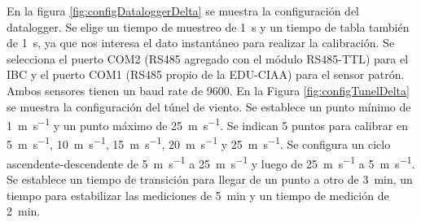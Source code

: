 En la figura \ref{fig:configDataloggerDelta} se muestra la configuración del datalogger. Se elige un tiempo de muestreo de \SI{1}{\second} y un tiempo de tabla también de \SI{1}{\second}, ya que nos interesa el dato instantáneo para realizar la calibración. Se selecciona el puerto COM2 (RS485 agregado con el módulo RS485-TTL) para el IBC y el puerto COM1 (RS485 propio de la EDU-CIAA) para el sensor patrón. Ambos sensores tienen un baud rate de \SI{9600}{}. En la Figura \ref{fig:configTunelDelta} se muestra la configuración del túnel de viento. Se establece un punto mínimo de \SI{1}{\meter\per\second} y un punto máximo de \SI{25}{\meter\per\second}. Se indican 5 puntos para calibrar en \SI{5}{\meter\per\second}, \SI{10}{\meter\per\second}, \SI{15}{\meter\per\second}, \SI{20}{\meter\per\second} y \SI{25}{\meter\per\second}. Se configura un ciclo ascendente-descendente de \SI{5}{\meter\per\second} a \SI{25}{\meter\per\second} y luego de \SI{25}{\meter\per\second} a \SI{5}{\meter\per\second}. Se establece un tiempo de transición para llegar de un punto a otro de \SI{3}{\minute}, un tiempo para estabilizar las mediciones de \SI{5}{\minute} y un tiempo de medición de \SI{2}{\minute}.

